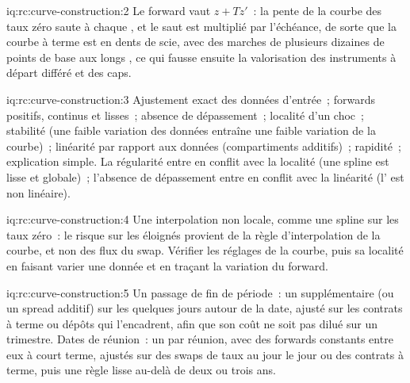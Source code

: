\begin{solution}{iq:rc:curve-construction:2}
Le forward vaut $z+Tz'$~: la pente de la courbe des taux zéro saute à chaque , et
le saut est multiplié par l'échéance, de sorte que la courbe à terme est en dents de scie,
avec des marches de plusieurs dizaines de points de base aux longs , ce qui
fausse ensuite la valorisation des instruments à départ différé et des caps.
\end{solution}

\begin{solution}{iq:rc:curve-construction:3}
Ajustement exact des données d'entrée~; forwards positifs, continus et lisses~; absence de dépassement~;
localité d'un choc~; stabilité (une faible variation des données entraîne une faible variation de la courbe)~;
linéarité par rapport aux données (compartiments additifs)~; rapidité~; explication simple.
La régularité entre en conflit avec la localité (une spline est lisse et globale)~; l'absence
de dépassement entre en conflit avec la linéarité (l' est non linéaire).
\end{solution}

\begin{solution}{iq:rc:curve-construction:4}
Une interpolation non locale, comme une spline sur les taux zéro~: le risque sur les 
éloignés provient de la règle d'interpolation de la courbe, et non des flux du swap. Vérifier
les réglages de la courbe, puis sa localité en faisant varier une donnée et en traçant la
variation du forward.
\end{solution}

\begin{solution}{iq:rc:curve-construction:5}
Un passage de fin de période~: un  supplémentaire (ou un spread additif) sur les
quelques jours autour de la date, ajusté sur les contrats à terme ou dépôts qui l'encadrent,
afin que son coût ne soit pas dilué sur un trimestre. Dates de réunion~: un  par
réunion, avec des forwards constants entre eux à court terme, ajustés sur des swaps de taux
au jour le jour ou des contrats à terme, puis une règle lisse au-delà de deux ou trois ans.
\end{solution}

